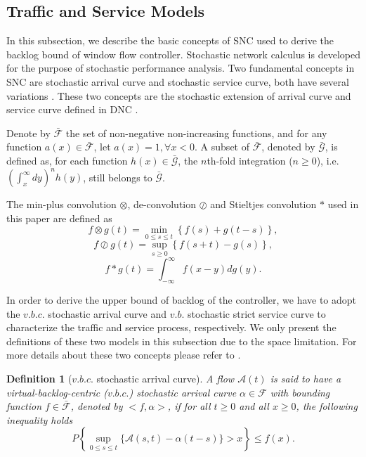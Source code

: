 \documentclass[12pt]{article}
\newtheorem{definition}{Definition}
\begin{document}
\subsection{Traffic and Service Models}\label{trafficservice}
In this subsection, we describe the basic concepts of SNC used to derive the backlog bound of window flow controller. Stochastic network calculus is developed for the purpose of stochastic performance analysis. Two fundamental concepts in SNC are stochastic arrival curve and stochastic service curve, both have several variations \cite{JiangLiu-15877,jiang2006basic}.
These two concepts are the stochastic extension of arrival curve and service curve defined in DNC \cite{Boudec2001Network}.

Denote by $\bar{\mathcal{F}}$ the set of non-negative non-increasing functions, and for any function $a(x)\in\bar{\mathcal{F}}$, let $a(x)=1,\forall x<0$. A subset of $\bar{\mathcal{F}}$, denoted by $\bar{\mathcal{G}}$, is defined as, for each function $h(x)\in\bar{\mathcal{G}}$, the $n$th-fold integration ($n\geq 0$), i.e. $(\int_{x}^\infty dy)^nh(y)$, still belongs to $\bar{\mathcal{G}}$.

The min-plus convolution $\otimes$, de-convolution $\oslash$ and Stieltjes convolution $\ast$ used in this paper are defined as
$$f\otimes g(t)=\min_{0\leq s\leq t}\left\{f(s)+g(t-s)\right\},$$
$$f\oslash g(t)=\sup_{s\geq 0}\left\{f(s+t)-g(s)\right\},$$
$$f\ast g(t)=\int_{-\infty}^{\infty}f(x-y)dg(y).$$

In order to derive the upper bound of backlog of the controller, we have to adopt the $v.b.c.$ stochastic arrival curve \cite{jiang2006basic,JiangLiu-15877} and $v.b.$ stochastic strict service curve \cite{Wu2010Model} to characterize the traffic and service process, respectively. We only present the definitions of these two models in this subsection due to the space limitation. For more details about these two concepts please refer to \cite{JiangLiu-15877,Wu2010Model,jiang2006basic}.

\begin{definition}[$v.b.c.$ stochastic arrival curve]
A flow $\mathcal{A}(t)$ is said to have a virtual-backlog-centric ($v.b.c.$) stochastic arrival curve $\alpha\in\mathcal{F}$ with bounding function $f\in\bar{\mathcal{F}}$, denoted by $<f,\alpha>$, if for all $t\geq 0$ and all $x\geq 0$, the following inequality holds
$$P\left\{\sup_{0\leq s\leq t}\{\mathcal{A}(s,t)-\alpha(t-s)\}>x\right\}\leq f(x).$$
\end{definition}
\end{document}
